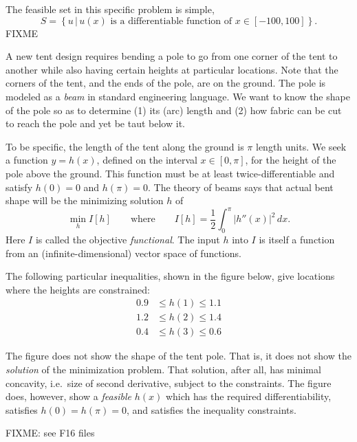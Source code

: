 \documentclass[11pt]{amsart}
\begin{document}
\begin{enumerate}
The feasible set in this specific problem is simple,
    $$S = \left\{u \,\big|\, u(x) \text{ is a differentiable function of } x\in[-100,100]\right\}.$$
FIXME



\quad A new tent design requires bending a pole to go from one corner of the tent to another while also having certain heights at particular locations.  Note that the corners of the tent, and the ends of the pole, are on the ground.  The pole is modeled as a \emph{beam} in standard engineering language.  We want to know the shape of the pole so as to determine (1) its (arc) length and (2) how fabric can be cut to reach the pole and yet be taut below it.

To be specific, the length of the tent along the ground is $\pi$ length units.  We seek a function $y=h(x)$, defined on the interval $x\in[0,\pi]$, for the height of the pole above the ground.  This function must be at least twice-differentiable and satisfy $h(0)=0$ and $h(\pi)=0$.  The theory of beams says that actual bent shape will be the minimizing solution $h$ of
    $$\min_h I[h] \qquad \text{where} \qquad I[h] = \frac{1}{2} \int_0^\pi |h''(x)|^2\,dx.$$
Here $I$ is called the objective \emph{functional}.  The input $h$ into $I$ is itself a function from an (infinite-dimensional) vector space of functions.

The following particular inequalities, shown in the figure below, give locations where the heights are constrained:
\begin{align*}
0.9 &\le h(1) \le 1.1 \\
1.2 &\le h(2) \le 1.4 \\
0.4 &\le h(3) \le 0.6
\end{align*}

The figure does not show the shape of the tent pole.  That is, it does not show the \emph{solution} of the minimization problem.  That solution, after all, has minimal concavity, i.e.~size of second derivative, subject to the constraints.  The figure does, however, show a \emph{feasible} $h(x)$ which has the required differentiability, satisfies $h(0)=h(\pi)=0$, and satisfies the inequality constraints.

\bigskip
\begin{center}
FIXME: see F16 files
\end{center}

\end{enumerate}
\end{document}
